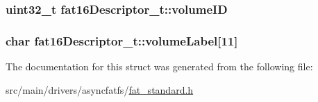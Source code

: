 \hypertarget{structfat16Descriptor__t_a339a8c42427a236f3d4c9f03a08ba04d}{
\subsubsection[{volume\+I\+D}]{\setlength{\rightskip}{0pt plus 5cm}uint32\+\_\+t fat16\+Descriptor\+\_\+t\+::volume\+I\+D}}\label{structfat16Descriptor__t_a339a8c42427a236f3d4c9f03a08ba04d}
\hypertarget{structfat16Descriptor__t_ac92cea6596998b85c2ce3954917053ae}{
\subsubsection[{volume\+Label}]{\setlength{\rightskip}{0pt plus 5cm}char fat16\+Descriptor\+\_\+t\+::volume\+Label\mbox{[}11\mbox{]}}}\label{structfat16Descriptor__t_ac92cea6596998b85c2ce3954917053ae}


The documentation for this struct was generated from the following file\+:\begin{DoxyCompactItemize}
\item 
src/main/drivers/asyncfatfs/\hyperlink{fat__standard_8h}{fat\+\_\+standard.\+h}\end{DoxyCompactItemize}
